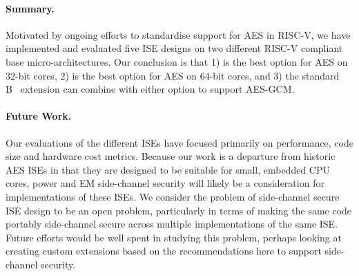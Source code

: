 

\paragraph{Summary.}
Motivated by ongoing efforts to standardise support 
for AES in RISC-V, we have implemented and evaluated five ISE designs 
on two different RISC-V compliant base micro-architectures.
Our conclusion is that
1) 
   is the best option for 
   AES on $32$-bit cores,
2) 
   is the best option for 
   AES on $64$-bit cores,
   and
3) the
   standard 
   B~\cite[Section 17]{RV:ISA:I:19}
   extension
   can combine with either option to support AES-GCM.

\paragraph{Future Work.}
Our evaluations of the different ISEs have focused primarily on
performance, code size and hardware cost metrics.
Because our work is a departure from historic
AES ISEs in that they are designed to be suitable for small, embedded
CPU cores, power and EM side-channel security will likely be a consideration
for implementations of these ISEs.
We consider the problem of side-channel secure ISE design to be an
open problem, particularly in terms of making the same code portably
side-channel secure across multiple implementations of the same ISE.
Future efforts would be well spent in studying this problem, perhaps
looking at creating custom extensions based on the recommendations here
to support side-channel security.

%

